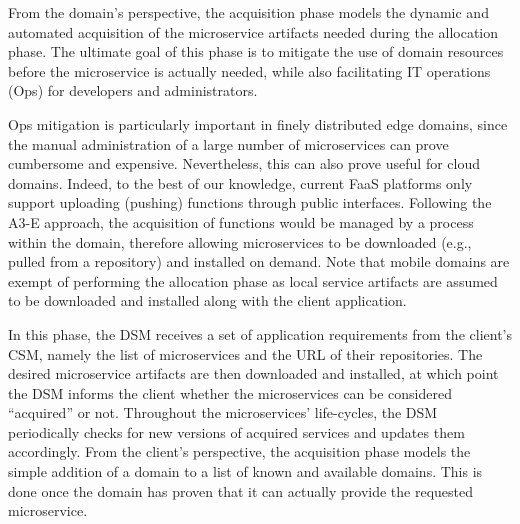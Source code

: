 
From the domain's perspective, the acquisition phase models the dynamic and automated acquisition of the microservice artifacts needed during the allocation phase. %
The ultimate goal of this phase is to mitigate the use of domain resources before the microservice is actually needed, while also facilitating IT operations (Ops) for developers and administrators. 

Ops mitigation is particularly important in finely distributed edge domains, since the manual administration of a large number of microservices can prove cumbersome and expensive. Nevertheless, this can also prove useful for cloud domains. Indeed, to the best of our knowledge, current FaaS platforms only support uploading (pushing) functions through public interfaces. Following the A3-E approach, the acquisition of functions would be managed by a process within the domain, therefore allowing microservices to be downloaded (e.g., pulled from a repository) and installed on demand. Note that mobile domains are exempt of performing the allocation phase as local service artifacts are assumed to be downloaded and installed along with the client application.


In this phase, the DSM receives a set of application requirements from the client's CSM, namely the list of microservices and the URL of their repositories. The desired microservice artifacts are then downloaded and installed, at which point the DSM informs the client whether the microservices can be considered ``acquired'' or not. 
Throughout the microservices' life-cycles, the DSM periodically checks for new versions of acquired services and updates them accordingly. 
From the client's perspective, the acquisition phase models the simple addition of a domain to a list of known and available domains. This is done once the domain has proven that it can actually provide the requested microservice. 


